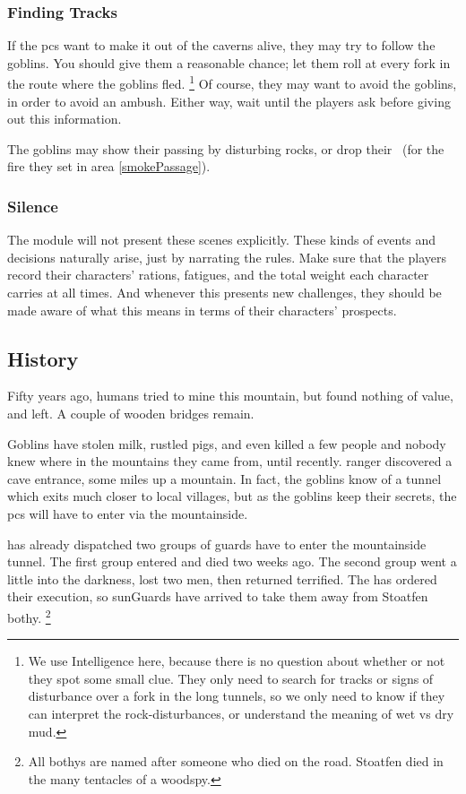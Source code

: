 \begin{multicols}{2}
\subsubsection{Finding Tracks}

If the \glspl{pc} want to make it out of the caverns alive, they may try to follow the goblins.
You should give them a reasonable chance; let them roll  at every fork in the route where the goblins fled.%
\footnote{We use Intelligence here, because there is no question about whether or not they spot some small clue.
They only need to search for tracks or signs of disturbance over a fork in the long tunnels, so we only need to know if they can interpret the rock-disturbances, or understand the meaning of wet vs dry mud.}
Of course, they may want to avoid the goblins, in order to avoid an ambush.
Either way, wait until the players ask before giving out this information.

The goblins may show their passing by disturbing rocks, or drop their \fireFuel\ (for the fire they set in area \ref{smokePassage}).

\subsubsection{Silence}

The module will not present these scenes explicitly.
These kinds of events and decisions naturally arise, just by narrating the rules.
Make sure that the players record their characters' rations, \glspl{fatigue}, and the total \gls{weight} each character carries at all times.
And whenever this presents new challenges, they should be made aware of what this means in terms of their characters' prospects.

\subsection{History}
\label{caves_history}

\noindent
Fifty years ago, humans tried to mine this mountain, but found nothing of value, and left.
A couple of wooden bridges remain.

Goblins have stolen milk, rustled pigs, and even killed a few people and nobody knew where in the mountains they came from, until recently.
 ranger discovered a cave entrance, some miles up a mountain.
In fact, the goblins know of a tunnel which exits much closer to local \glspl{village}, but as the goblins keep their secrets, the \glspl{pc} will have to enter via the mountainside.

 has already dispatched two groups of \glspl{guard} have to enter the mountainside tunnel.
The first group entered and died two weeks ago.
The second group went a little into the darkness, lost two men, then returned terrified.
The  has ordered their execution, so \glspl{sunGuard} have arrived to take them away from Stoatfen \gls{bothy}.%
\footnote{All \glspl{bothy} are named after someone who died on the road.
Stoatfen died in the many tentacles of a woodspy.}

\end{multicols}


